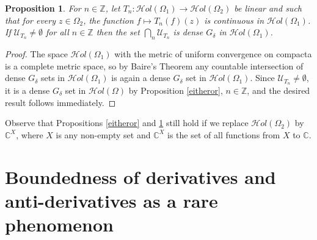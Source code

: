 \documentclass[11pt,twoside,a4paper]{article}
\newtheorem{proposition}[theorem]{Proposition}
\theoremstyle{remark}
\def\d{\delta}
\newcommand{\hol}{{\mathcal Hol}}
\newcommand{\holo}{{\mathcal Hol}(\Omega)}
\begin{document}
\begin{proposition}
\label{capuT_n}
  For $n \in \mathbb{Z}$, let $T_n: \hol(\Omega_1) \rightarrow \hol(\Omega_2)$ be linear and such that for every $z \in \Omega_2$, the function $ f \mapsto T_n (f)(z)$ is continuous in $\hol(\Omega_1)$. If $\mathcal{U}_{T_n} \neq \emptyset$ for all $n \in \mathbb{Z}$ then the set $\bigcap\limits_{n} \mathcal{U}_{T_n}$ is dense $G_\delta $ in $\hol(\Omega_1)$.
\end{proposition}
\begin{proof}
The space $\hol(\Omega_1)$ with the metric of uniform convergence on compacta is a complete metric space, so by Baire's Theorem any countable intersection of dense $G_\d$ sets in $\hol(\Omega_1)$ is again a dense $G_\d$ set in $\hol(\Omega_1)$. Since $\mathcal{U}_{T_n} \neq \emptyset$, it is a dense $G_\d$ set in $\holo$ by Proposition \ref{eitheror}, $n \in \mathbb{Z}$, and the desired result follows immediately.
\end{proof}
Observe that Propositions \ref{eitheror} and \ref{capuT_n} still hold if we replace $\hol(\Omega_2)$ by $\mathbb{C}^{X}$, where $X$ is any non-empty set and $\mathbb{C}^{X}$ is the set of all functions from $ X $ to $\mathbb{C}$.

\section{Boundedness of derivatives and anti-derivatives as a rare phenomenon}
\end{document}
